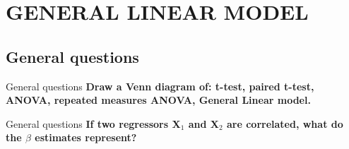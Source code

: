 \documentclass{beamer}
\begin{document}
\section{GENERAL LINEAR MODEL}

\subsection[General questions]{General questions}


\begin{frame}{General questions}
  \textbf{Draw a Venn diagram of: t-test, paired t-test, ANOVA, repeated measures ANOVA, General Linear model.}

\end{frame} 

% 


\begin{frame}{General questions}
  \textbf{If two regressors X$_{1}$ and X$_{2}$ are correlated, what do the $\beta$ estimates represent?}

% 
\end{frame} 

% 
% 
\end{document}
